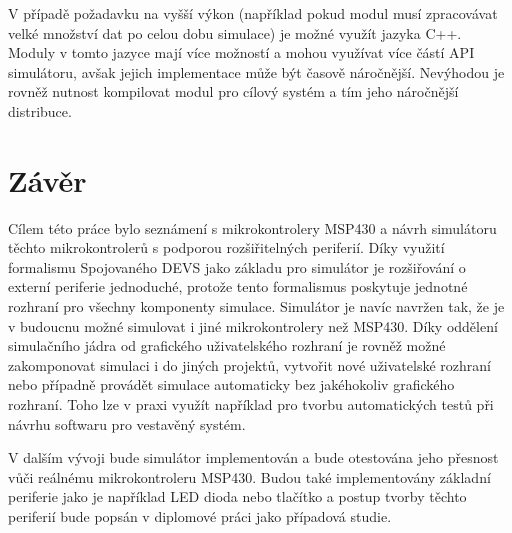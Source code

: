 V případě požadavku na vyšší výkon (například pokud modul musí zpracovávat velké množství dat po celou dobu simulace) je možné využít jazyka C++. Moduly v tomto jazyce mají více možností a mohou využívat více částí API simulátoru, avšak jejich implementace může být časově náročnější. Nevýhodou je rovněž nutnost kompilovat modul pro cílový systém a tím jeho náročnější distribuce.


\chapter{Závěr}

Cílem této práce bylo seznámení s mikrokontrolery MSP430 a návrh simulátoru těchto mikrokontrolerů s podporou rozšiřitelných periferií. Díky využití formalismu Spojovaného DEVS jako základu pro simulátor je rozšiřování o externí periferie jednoduché, protože tento formalismus poskytuje jednotné rozhraní pro všechny komponenty simulace. Simulátor je navíc navržen tak, že je v budoucnu možné simulovat i jiné mikrokontrolery než MSP430. Díky oddělení simulačního jádra od grafického uživatelského rozhraní je rovněž možné zakomponovat simulaci i do jiných projektů, vytvořit nové uživatelské rozhraní nebo případně provádět simulace automaticky bez jakéhokoliv grafického rozhraní. Toho lze v praxi využít například pro tvorbu automatických testů při návrhu softwaru pro vestavěný systém.

V dalším vývoji bude simulátor implementován a bude otestována jeho přesnost vůči reálnému mikrokontroleru MSP430. Budou také implementovány základní periferie jako je například LED dioda nebo tlačítko a postup tvorby těchto periferií bude popsán v diplomové práci jako případová studie.




